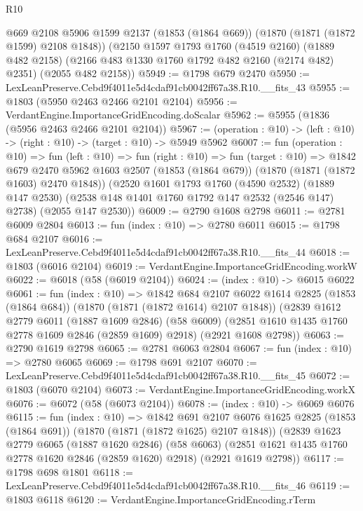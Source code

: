 \begin{lexlean}{R10}
\begin{coremodule}
    @669
    @2108
    @5906
    @1599
    @2137
    (@1853 (@1864 @669))
    (@1870 (@1871 (@1872 @1599) @2108 @1848))
    (@2150
      @1597
      @1793
      @1760
      (@4519 @2160)
      (@1889 @482 @2158)
      (@2166 @483 @1330 @1760 @1792 @482 @2160 (@2174 @482) @2351)
      (@2055 @482 @2158))
@5949 := @1798 @679 @2470
@5950 := LexLeanPreserve.Cebd9f4011e5d4cdaf91cb0042ff67a38.R10.__fits_43
@5955 := @1803 (@5950 @2463 @2466 @2101 @2104)
@5956 := VerdantEngine.ImportanceGridEncoding.doScalar
@5962 := @5955 (@1836 (@5956 @2463 @2466 @2101 @2104))
@5967 := (operation : @10) -> (left : @10) -> (right : @10) -> (target : @10) -> @5949 @5962
@6007 := fun (operation : @10) =>
  fun (left : @10) =>
  fun (right : @10) =>
  fun (target : @10) =>
  @1842
    @679
    @2470
    @5962
    @1603
    @2507
    (@1853 (@1864 @679))
    (@1870 (@1871 (@1872 @1603) @2470 @1848))
    (@2520
      @1601
      @1793
      @1760
      (@4590 @2532)
      (@1889 @147 @2530)
      (@2538 @148 @1401 @1760 @1792 @147 @2532 (@2546 @147) @2738)
      (@2055 @147 @2530))
@6009 := @2790 @1608 @2798
@6011 := @2781 @6009 @2804
@6013 := fun (index : @10) => @2780 @6011
@6015 := @1798 @684 @2107
@6016 := LexLeanPreserve.Cebd9f4011e5d4cdaf91cb0042ff67a38.R10.__fits_44
@6018 := @1803 (@6016 @2104)
@6019 := VerdantEngine.ImportanceGridEncoding.workW
@6022 := @6018 (@58 (@6019 @2104))
@6024 := (index : @10) -> @6015 @6022
@6061 := fun (index : @10) =>
  @1842
    @684
    @2107
    @6022
    @1614
    @2825
    (@1853 (@1864 @684))
    (@1870 (@1871 (@1872 @1614) @2107 @1848))
    (@2839
      @1612
      @2779
      @6011
      (@1887 @1609 @2846)
      (@58 @6009)
      (@2851 @1610 @1435 @1760 @2778 @1609 @2846 (@2859 @1609) @2918)
      (@2921 @1608 @2798))
@6063 := @2790 @1619 @2798
@6065 := @2781 @6063 @2804
@6067 := fun (index : @10) => @2780 @6065
@6069 := @1798 @691 @2107
@6070 := LexLeanPreserve.Cebd9f4011e5d4cdaf91cb0042ff67a38.R10.__fits_45
@6072 := @1803 (@6070 @2104)
@6073 := VerdantEngine.ImportanceGridEncoding.workX
@6076 := @6072 (@58 (@6073 @2104))
@6078 := (index : @10) -> @6069 @6076
@6115 := fun (index : @10) =>
  @1842
    @691
    @2107
    @6076
    @1625
    @2825
    (@1853 (@1864 @691))
    (@1870 (@1871 (@1872 @1625) @2107 @1848))
    (@2839
      @1623
      @2779
      @6065
      (@1887 @1620 @2846)
      (@58 @6063)
      (@2851 @1621 @1435 @1760 @2778 @1620 @2846 (@2859 @1620) @2918)
      (@2921 @1619 @2798))
@6117 := @1798 @698 @1801
@6118 := LexLeanPreserve.Cebd9f4011e5d4cdaf91cb0042ff67a38.R10.__fits_46
@6119 := @1803 @6118
@6120 := VerdantEngine.ImportanceGridEncoding.rTerm

\end{coremodule}
\end{lexlean}
